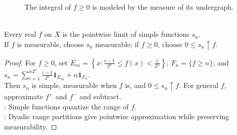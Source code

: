 \begin{figure}[H]
  \centering
  
  \caption{The integral of $f\geq0$ is modeled by the measure of its undergraph.}
  \label{fig:lebesgue-undergraph}
\end{figure}

\begin{theorem} \label{thm:simple-approximation-measurable-functions} \\
Every real $f$ on $X$ is the pointwise limit of simple functions $s_n$.\\
If $f$ is measurable, choose $s_n$ measurable; if $f\geq0$, choose $0\leq s_n\uparrow f$.
\begin{proof}
For $f\geq0$, set $E_{ni}=\left\{x:\frac{i-1}{2^n}\leq f(x)<\frac{i}{2^n}\right\}$; $F_n=\{f\geq n\}$; and $s_n=\sum\limits_{i=1}^{n2^n}\frac{i-1}{2^n}\mathbf{1}_{E_{ni}}+n\mathbf{1}_{F_n}$.\\
Then $s_n$ is simple, measurable when $f$ is, and $0\leq s_n\uparrow f$. For general $f$, approximate $f^+$ and $f^-$ and subtract.\\
: Simple functions quantize the range of $f$.\\
: Dyadic range partitions give pointwise approximation while preserving measurability.
\end{proof}
\end{theorem}

